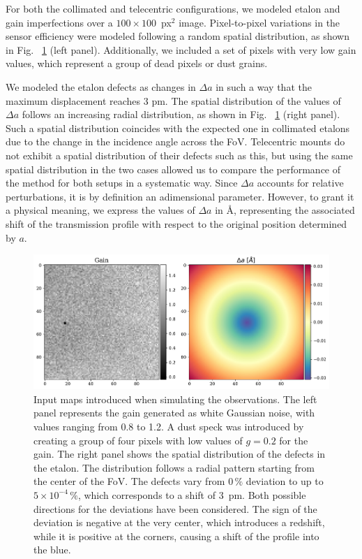 For both the collimated and telecentric configurations, we modeled etalon and gain imperfections over a $100\times100$~px$^2$ image. Pixel-to-pixel variations in the sensor efficiency were modeled following a random spatial distribution, as shown in Fig.~ \ref{fig_etalon_corr: Inputs} (left panel). Additionally, we included a set of pixels with very low gain values, which represent a group of dead pixels or dust grains.

We modeled the etalon defects as changes in $\Delta a$ in such a way that the maximum displacement reaches $3$ pm. The spatial distribution of the values of  $\Delta a $ follows an increasing radial distribution, as shown in Fig.~ \ref{fig_etalon_corr: Inputs} (right panel). Such a spatial distribution coincides with the expected one in collimated etalons due to the change in the incidence angle across the FoV. Telecentric mounts do not exhibit a spatial distribution of their defects such as this, but using the same spatial distribution in the two cases allowed us to compare the performance of the method for both setups in a systematic way. Since $\Delta a$ accounts for relative perturbations, it is by definition an adimensional parameter. However, to grant it a physical meaning, we express the values of $\Delta a$ in \r{A}, representing the associated shift of the transmission profile with respect to the original position determined by $a$.

\begin{figure}[t]
  \centering
    \includegraphics[width=\textwidth]{figures/EtalonPaper/Gain_Da_Inputs.pdf}
    \caption[Simulation inputs.]{
      Input maps introduced when simulating the observations. The left panel represents the gain generated as white Gaussian noise, with values ranging from 0.8 to 1.2. A dust speck was introduced by creating a group of four pixels with low values of $g=0.2$ for the gain. The right panel shows the spatial distribution of the defects in the etalon. The distribution follows a radial pattern starting from the center of the FoV. The defects vary from $0\,\%$ deviation to up to $5\times 10 ^{-4}\,\%$, which corresponds to a shift of 3~pm. Both possible directions for the deviations have been considered. The sign of the deviation is negative at the very center, which introduces a redshift, while it is positive at the corners, causing a shift of the profile into the blue.
      \label{fig_etalon_corr: Inputs}}
\end{figure}

